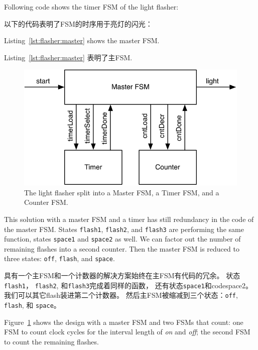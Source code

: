 \documentclass[%
    10pt,
    headinclude, footexclude,
    openright, %
    notitlepage,
    cleardoubleempty,
    headsepline,
    pointlessnumbers,
    bibtotoc, idxtotoc,
    ]{scrbook}
\newcommand{\code}[1]{{\small{\texttt{#1}}}}
\newcommand{\scale}{0.7}
\begin{document}
{\noindent Following code shows the timer FSM of the light flasher:

\noindent 以下的代码表明了FSM的时序用于亮灯的闪光：


\noindent Listing~\ref{lst:flasher:master} shows the master FSM.

\noindent Listing~\ref{lst:flasher:master} 表明了主FSM.



\begin{figure}
  \centering
  \includegraphics[scale=\scale]{figures/flasher2}
  \caption{The light flasher split into a Master FSM, a Timer FSM, and a Counter FSM.}
  \label{fig:flasher2}
\end{figure}

This solution with a master FSM and a timer has still redundancy in the code
of the master FSM. States \code{flash1}, \code{flash2}, and \code{flash3}
are performing the same function, states \code{space1} and \code{space2} as well.
We can factor out the number of remaining flashes into a second counter.
Then the master FSM is reduced to three states: \code{off}, \code{flash},
and \code{space}.

具有一个主FSM和一个计数器的解决方案始终在主FSM有代码的冗余。
状态\code{flash1}， \code{flash2}, 和\code{flash3}完成着同样的函数，
还有状态\code{space1}和code{space2}。
我们可以其它flash装进第二个计数器。
然后主FSM被缩减到三个状态：\code{off}, \code{flash},
和 \code{space}。


Figure~\ref{fig:flasher2} shows the design with a master FSM and two FSMs
that count: one FSM to count clock cycles for the interval length of \emph{on}
and \emph{off}; the second FSM to count the remaining flashes.

}
\end{document}
